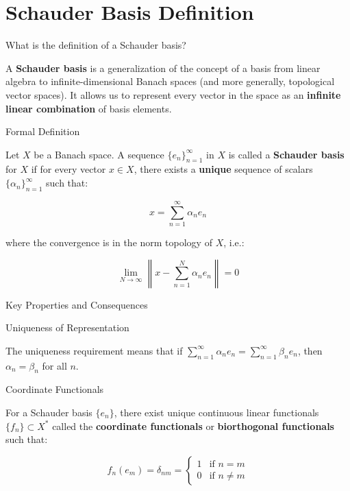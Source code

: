 \documentclass[aps,preprint]{revtex4}
\newenvironment{question}
  {\begin{tcolorbox}[colback=blue!5!white,colframe=blue!75!black,title=Question]}
  {\end{tcolorbox}}
\newenvironment{answer}
  {\begin{tcolorbox}[colback=green!5!white,colframe=green!75!black,title=Answer]}
  {\end{tcolorbox}}
\begin{document}
\section{Schauder Basis Definition}

\begin{question}
What is the definition of a Schauder basis?
\end{question}

\begin{answer}
A \textbf{Schauder basis} is a generalization of the concept of a basis from
linear algebra to infinite-dimensional Banach spaces (and more generally,
topological vector spaces). It allows us to represent every vector in the
space as an \textbf{infinite linear combination} of basis elements.

Formal Definition

Let $X$ be a Banach space. A sequence $\{e_n\}_{n=1}^\infty$ in $X$ is
called a \textbf{Schauder basis} for $X$ if for every vector $x \in X$,
there exists a \textbf{unique} sequence of scalars $\{\alpha_n\}_{n=1}^%
\infty $ such that:

\begin{equation*}
x = \sum_{n=1}^\infty \alpha_n e_n
\end{equation*}

where the convergence is in the norm topology of $X$, i.e.:

\begin{equation*}
\lim_{N \to \infty} \left\| x - \sum_{n=1}^N \alpha_n e_n \right\| = 0
\end{equation*}

Key Properties and Consequences

Uniqueness of Representation

The uniqueness requirement means that if $\sum_{n=1}^\infty \alpha_n e_n =
\sum_{n=1}^\infty \beta_n e_n$, then $\alpha_n = \beta_n$ for all $n$.

Coordinate Functionals

For a Schauder basis $\{e_n\}$, there exist unique continuous linear
functionals $\{f_n\} \subset X^*$ called the \textbf{coordinate functionals}
or \textbf{biorthogonal functionals} such that:

\begin{equation*}
f_n(e_m) = \delta_{nm} = 
\begin{cases}
1 & \text{if } n = m \\ 
0 & \text{if } n \neq m%
\end{cases}%
\end{equation*}


\end{answer}
\end{document}
